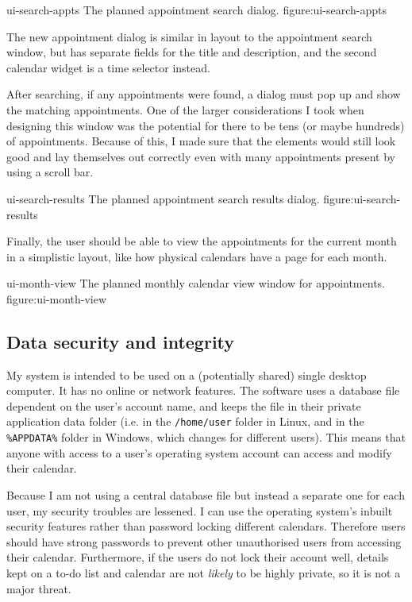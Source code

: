 \addfigure
    {ui-search-appts}
    {The planned appointment search dialog.}
    {figure:ui-search-appts}

The new appointment dialog is similar in layout to the appointment search
window, but has separate fields for the title and description, and the second
calendar widget is a time selector instead.

After searching, if any appointments were found, a dialog must pop up and show
the matching appointments. One of the larger considerations I took when
designing this window was the potential for there to be tens (or maybe hundreds)
of appointments. Because of this, I made sure that the elements would still look
good and lay themselves out correctly even with many appointments present by
using a scroll bar.

\addfigure
    {ui-search-results}
    {The planned appointment search results dialog.}
    {figure:ui-search-results}

Finally, the user should be able to view the appointments for the current month
in a simplistic layout, like how physical calendars have a page for each month.

\addfigure
    {ui-month-view}
    {The planned monthly calendar view window for appointments.}
    {figure:ui-month-view}


\subsection{Data security and integrity}

My system is intended to be used on a (potentially shared) single desktop
computer. It has no online or network features. The software uses a database
file dependent on the user's account name, and keeps the file in their private
application data folder (i.e. in the \texttt{/home/user} folder in Linux, and in
the \verb|%APPDATA%| folder in Windows, which changes for different users). This
means that anyone with access to a user's operating system account can access
and modify their calendar.

Because I am not using a central database file but instead a separate one for
each user, my security troubles are lessened. I can use the operating system's
inbuilt security features rather than password locking different calendars.
Therefore users should have strong passwords to prevent other unauthorised users
from accessing their calendar. Furthermore, if the users do not lock their
account well, details kept on a to-do list and calendar are not \textit{likely}
to be highly private, so it is not a major threat.


